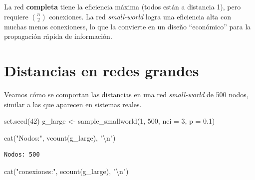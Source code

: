 \documentclass[
  letterpaper,
  DIV=11,
  numbers=noendperiod]{scrreprt}
\newenvironment{Shaded}{\begin{snugshade}}{\end{snugshade}}
\newcommand{\AttributeTok}[1]{\textcolor[rgb]{0.40,0.45,0.13}{#1}}
\newcommand{\DecValTok}[1]{\textcolor[rgb]{0.68,0.00,0.00}{#1}}
\newcommand{\FloatTok}[1]{\textcolor[rgb]{0.68,0.00,0.00}{#1}}
\newcommand{\FunctionTok}[1]{\textcolor[rgb]{0.28,0.35,0.67}{#1}}
\newcommand{\NormalTok}[1]{\textcolor[rgb]{0.00,0.23,0.31}{#1}}
\newcommand{\OtherTok}[1]{\textcolor[rgb]{0.00,0.23,0.31}{#1}}
\newcommand{\SpecialCharTok}[1]{\textcolor[rgb]{0.37,0.37,0.37}{#1}}
\newcommand{\StringTok}[1]{\textcolor[rgb]{0.13,0.47,0.30}{#1}}
\begin{document}
\begin{tcolorbox}[enhanced jigsaw, toprule=.15mm, colframe=quarto-callout-tip-color-frame, coltitle=black, titlerule=0mm, colback=white, breakable, leftrule=.75mm, arc=.35mm, bottomtitle=1mm, toptitle=1mm, rightrule=.15mm, bottomrule=.15mm, left=2mm, title=\textcolor{quarto-callout-tip-color}{\faLightbulb}\hspace{0.5em}{💡 Concepto clave}, colbacktitle=quarto-callout-tip-color!10!white, opacityback=0, opacitybacktitle=0.6]

La red \textbf{completa} tiene la eficiencia máxima (todos están a
distancia 1), pero requiere \(\binom{n}{2}\) conexiones. La red
\emph{small-world} logra una eficiencia alta con muchas menos
conexioness, lo que la convierte en un diseño ``económico'' para la
propagación rápida de información.

\end{tcolorbox}

\section{Distancias en redes grandes}\label{distancias-en-redes-grandes}

Veamos cómo se comportan las distancias en una red \emph{small-world} de
500 nodos, similar a las que aparecen en sistemas reales.

\begin{Shaded}
\begin{Highlighting}[]
\FunctionTok{set.seed}\NormalTok{(}\DecValTok{42}\NormalTok{)}
\NormalTok{g\_large }\OtherTok{\textless{}{-}} \FunctionTok{sample\_smallworld}\NormalTok{(}\DecValTok{1}\NormalTok{, }\DecValTok{500}\NormalTok{, }\AttributeTok{nei =} \DecValTok{3}\NormalTok{, }\AttributeTok{p =} \FloatTok{0.1}\NormalTok{)}

\FunctionTok{cat}\NormalTok{(}\StringTok{"Nodos:"}\NormalTok{, }\FunctionTok{vcount}\NormalTok{(g\_large), }\StringTok{"}\SpecialCharTok{\textbackslash{}n}\StringTok{"}\NormalTok{)}
\end{Highlighting}
\end{Shaded}

\begin{verbatim}
Nodos: 500 
\end{verbatim}

\begin{Shaded}
\begin{Highlighting}[]
\FunctionTok{cat}\NormalTok{(}\StringTok{"conexiones:"}\NormalTok{, }\FunctionTok{ecount}\NormalTok{(g\_large), }\StringTok{"}\SpecialCharTok{\textbackslash{}n}\StringTok{"}\NormalTok{)}
\end{Highlighting}
\end{Shaded}
\end{document}
